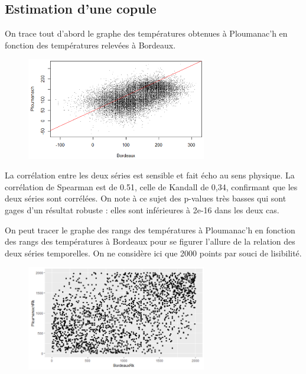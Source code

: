 \documentclass[../report.tex]{subfiles}
\begin{document}
\subsection{Estimation d’une copule }

\par On trace tout d’abord le graphe des températures obtenues à Ploumanac’h en fonction des températures relevées à Bordeaux.

\begin{figure}[H]
  \centering
    \includegraphics[width=0.7\textwidth]{images/part_3/scatterplot.png}
\end{figure}

\par La corrélation entre les deux séries est sensible et fait écho au sens physique. La corrélation de Spearman est de 0.51, celle de Kandall de 0,34, confirmant que les deux séries sont corrélées. On note à ce sujet des p-values très basses qui sont gages d’un résultat robuste : elles sont inférieures à 2e-16 dans les deux cas.

\par On peut tracer le graphe des rangs des températures à Ploumanac’h en fonction des rangs des températures à Bordeaux pour se figurer l’allure de la relation des deux séries temporelles. On ne considère ici que 2000 points par souci de lisibilité.

\begin{figure}[H]
  \centering
    \includegraphics[width=0.7\textwidth]{images/part_3/scatterrank.png}
\end{figure}
\end{document}
